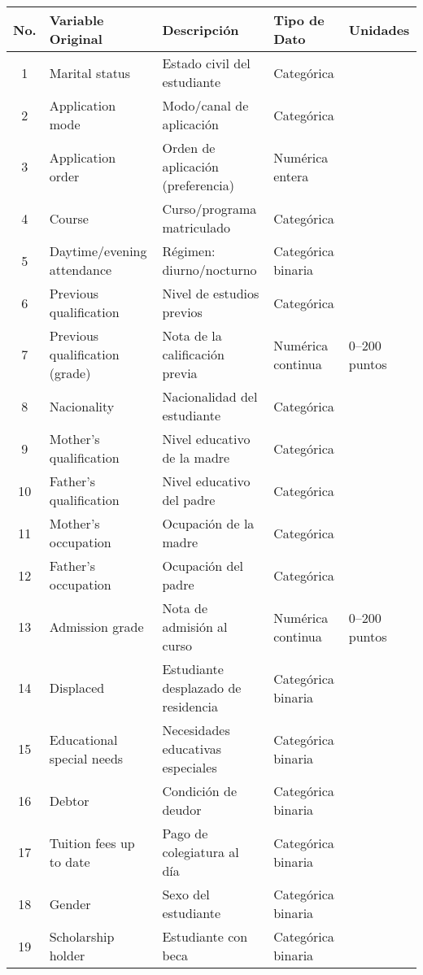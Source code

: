 \begin{table}[H]
\centering
\small
\begin{tabular}{|c|p{5cm}|p{6cm}|p{3cm}|p{3cm}|}
\hline
\textbf{No.} & \textbf{Variable Original} & \textbf{Descripción} & \textbf{Tipo de Dato} & \textbf{Unidades} \\ \hline
1 & Marital status & Estado civil del estudiante & Categórica &  \\ \hline
2 & Application mode & Modo/canal de aplicación & Categórica &  \\ \hline
3 & Application order & Orden de aplicación (preferencia) & Numérica entera &  \\ \hline
4 & Course & Curso/programa matriculado & Categórica &  \\ \hline
5 & Daytime/evening attendance & Régimen: diurno/nocturno & Categórica binaria &  \\ \hline
6 & Previous qualification & Nivel de estudios previos & Categórica &  \\ \hline
7 & Previous qualification (grade) & Nota de la calificación previa & Numérica continua & 0–200 puntos \\ \hline
8 & Nacionality & Nacionalidad del estudiante & Categórica &  \\ \hline
9 & Mother's qualification & Nivel educativo de la madre & Categórica &  \\ \hline
10 & Father's qualification & Nivel educativo del padre & Categórica &  \\ \hline
11 & Mother's occupation & Ocupación de la madre & Categórica &  \\ \hline
12 & Father's occupation & Ocupación del padre & Categórica &  \\ \hline
13 & Admission grade & Nota de admisión al curso & Numérica continua & 0–200 puntos \\ \hline
14 & Displaced & Estudiante desplazado de residencia & Categórica binaria &  \\ \hline
15 & Educational special needs & Necesidades educativas especiales & Categórica binaria &  \\ \hline
16 & Debtor & Condición de deudor & Categórica binaria &  \\ \hline
17 & Tuition fees up to date & Pago de colegiatura al día & Categórica binaria &  \\ \hline
18 & Gender & Sexo del estudiante & Categórica binaria &  \\ \hline
19 & Scholarship holder & Estudiante con beca & Categórica binaria &  \\ \hline

\end{tabular}
\end{table}
